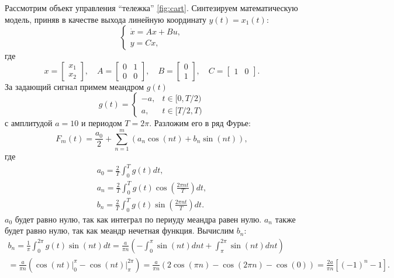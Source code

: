 Рассмотрим объект управления ``тележка'' \autoref{fig:cart}. Синтезируем математическую модель,
приняв в качестве выхода линейную координату $y(t) = x_1(t)$:
\begin{equation*}
    \begin{cases}
        \dot x =Ax+Bu,\\
        y=Cx,
    \end{cases}
\end{equation*}
где
\begin{equation*}
    x=\begin{bmatrix}
        x_1\\x_2
    \end{bmatrix},\quad
    A=\begin{bmatrix}
        0 & 1\\
        0 & 0
    \end{bmatrix},\quad
    B=\begin{bmatrix}
        0\\1
    \end{bmatrix},\quad
    C=\begin{bmatrix}
        1 & 0
    \end{bmatrix}.
\end{equation*}
За задающий сигнал 
примем меандром $g(t)$
\begin{equation}
    g(t) = \begin{cases}
        -a, & t \in [0, T/2)\\
        a, & t \in [T/2, T)
    \end{cases}
\end{equation}
с амплитудой $a=10$ и периодом $T=2\pi$.
Разложим его в ряд Фурье:
\begin{equation*}
    F_m(t)=\frac{a_0}{2}+\sum_{n=1}^{m}(a_n\cos(nt)+b_n\sin(nt)),
\end{equation*}
где
\begin{gather*}
    a_0=\frac{2}{T}\int_0^T g(t)dt,\\
    a_n=\frac{2}{T}\int_0^T g(t)\cos\left(\frac{2\pi nt}{T}\right)dt,\\
    b_n=\frac{2}{T}\int_0^T g(t)\sin\left(\frac{2\pi nt}{T}\right)dt.
\end{gather*}
$a_0$ будет равно нулю, так как интеграл по периуду меандра равен нулю.
$a_n$ также будет равно нулю, так как меандр нечетная функция. Вычислим
$b_n$:
\begin{multline*}
    b_n =\frac{1}{\pi}\int_0^{2\pi}g(t)\sin(nt)dt
    =\frac{a}{\pi n}\left( -\int_{0}^{\pi}\sin(nt)dnt+\int_{\pi}^{2\pi}\sin(nt)dnt \right)\\
    =\frac{a}{\pi n}\left( \cos(nt)\Big|_0^\pi-\cos(nt)\Big|_\pi^{2\pi} \right)
    =\frac{a}{\pi n}(2\cos(\pi n)-\cos(2\pi n)-\cos(0))
    =\frac{2a}{\pi n}[(-1)^n-1].
\end{multline*}
